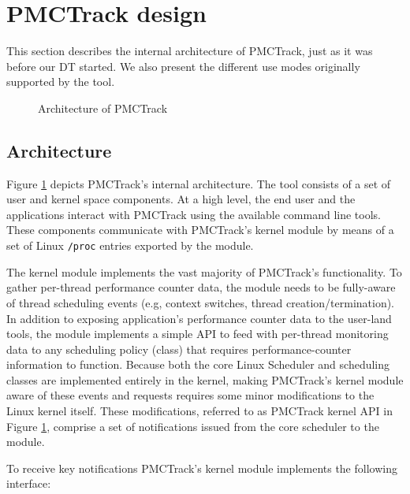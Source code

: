 \section{PMCTrack design}\label{pmctrack-design}

This section describes the internal architecture of PMCTrack, just as it
was before our DT started. We also present the different use modes originally supported by the tool.

\begin{figure}[tbp]
\centering

\caption{Architecture of PMCTrack}
\label{fig:arch}
\end{figure}

\subsection{Architecture}\label{architecture}

Figure \ref{fig:arch} depicts PMCTrack's internal architecture. The tool
consists of a set of user and kernel space components. At a high level,
the end user and the applications interact with PMCTrack using the
available command line tools. These components communicate with
PMCTrack's kernel module by means of a set of Linux \texttt{/proc}
entries exported by the module.

The kernel module implements the vast majority of PMCTrack's
functionality. To gather per-thread performance counter data, the module
needs to be fully-aware of thread scheduling events (e.g, context
switches, thread creation/termination). In addition to exposing
application's performance counter data to the user-land tools, the module
implements a simple API to feed with per-thread monitoring data to any
scheduling policy (class) that requires performance-counter information
to function. Because both the core Linux Scheduler and scheduling
classes are implemented entirely in the kernel, making PMCTrack's kernel
module aware of these events and requests requires some minor
modifications to the Linux kernel itself. These modifications, referred
to as PMCTrack kernel API in Figure \ref{fig:arch}, comprise a set of
notifications issued from the core scheduler to the module.

To receive key notifications PMCTrack's kernel module implements the following interface:

